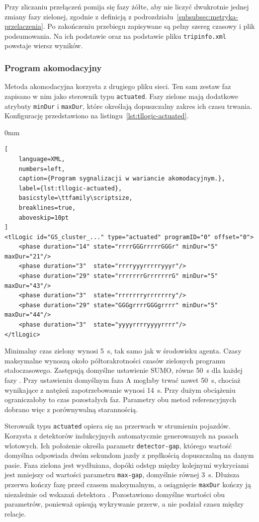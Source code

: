 Przy zliczaniu przełączeń pomija się fazy żółte, aby nie liczyć dwukrotnie jednej zmiany fazy zielonej, zgodnie z definicją z podrozdziału~\ref{subsubsec:metryka-przelaczenia}. Po zakończeniu przebiegu zapisywane są pełny szereg czasowy i plik podsumowania. Na ich podstawie oraz na podstawie pliku \texttt{tripinfo.xml} powstaje wiersz wyników.

\subsubsection{Program akomodacyjny}
\label{subsubsec:impl-akomodacyjny}

Metoda akomodacyjna korzysta z drugiego pliku sieci. Ten sam zestaw faz zapisano w nim jako sterownik typu \texttt{actuated}. Fazy zielone mają dodatkowe atrybuty \texttt{minDur} i \texttt{maxDur}, które określają dopuszczalny zakres ich czasu trwania. Konfigurację przedstawiono na listingu~\ref{lst:tllogic-actuated}.

\begin{addmargin}[8mm]{0mm}
\begin{lstlisting}[
    language=XML,
    numbers=left,
    caption={Program sygnalizacji w wariancie akomodacyjnym.},
    label={lst:tllogic-actuated},
    basicstyle=\ttfamily\scriptsize,
    breaklines=true,
    aboveskip=10pt
]
<tlLogic id="GS_cluster_..." type="actuated" programID="0" offset="0">
    <phase duration="14" state="rrrrGGGrrrrrGGGr" minDur="5" maxDur="21"/>
    <phase duration="3"  state="rrrryyyrrrrryyyr"/>
    <phase duration="29" state="rrrrrrrGrrrrrrrG" minDur="5" maxDur="43"/>
    <phase duration="3"  state="rrrrrrryrrrrrrry"/>
    <phase duration="29" state="GGGgrrrrGGGgrrrr" minDur="5" maxDur="44"/>
    <phase duration="3"  state="yyyyrrrryyyyrrrr"/>
</tlLogic>
\end{lstlisting}
\end{addmargin}

Minimalny czas zielony wynosi 5~s, tak samo jak w środowisku agenta. Czasy maksymalne wynoszą około półtorakrotności czasów zielonych programu stałoczasowego. Zastępują domyślne ustawienie SUMO, równe 50~s dla każdej fazy \cite{sumoTrafficLights}. Przy ustawieniu domyślnym faza A mogłaby trwać nawet 50~s, chociaż wynikające z natężeń zapotrzebowanie wynosi 14~s. Przy dużym obciążeniu ograniczałoby to czas pozostałych faz. Parametry obu metod referencyjnych dobrano więc z porównywalną starannością.

Sterownik typu \texttt{actuated} opiera się na przerwach w strumieniu pojazdów. Korzysta z detektorów indukcyjnych automatycznie generowanych na pasach wlotowych. Ich położenie określa parametr \texttt{detector-gap}, którego wartość domyślna odpowiada dwóm sekundom jazdy z prędkością dopuszczalną na danym pasie. Faza zielona jest wydłużana, dopóki odstęp między kolejnymi wykryciami jest mniejszy od wartości parametru \texttt{max-gap}, domyślnie równej 3~s. Dłuższa przerwa kończy fazę przed czasem maksymalnym, a osiągnięcie \texttt{maxDur} kończy ją niezależnie od wskazań detektora \cite{sumoTrafficLights}. Pozostawiono domyślne wartości obu parametrów, ponieważ opisują wykrywanie przerw, a nie podział czasu między relacje.

